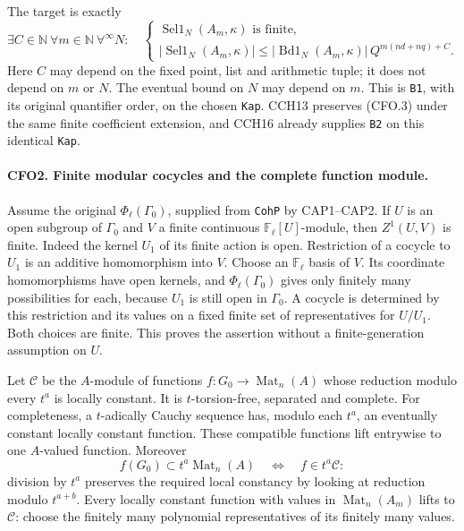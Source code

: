 The target is exactly
\[
 \exists C\in\mathbb N\ \forall m\in\mathbb N\
 \forall^\infty N:\quad
 \begin{cases}
  \operatorname{Sel1}_N(A_m,\kappa)\text{ is finite},\\
  |\operatorname{Sel1}_N(A_m,\kappa)|
   \le |\operatorname{Bd1}_N(A_m,\kappa)|\,Q^{m(nd+nq)+C}.
 \end{cases}                                                     \tag{CFO.4}
\]
Here $C$ may depend on the fixed point, list and arithmetic tuple;
it does not depend on $m$ or $N$.  The eventual bound on $N$ may
depend on $m$.  This is \texttt{B1}, with its original quantifier
order, on the chosen \texttt{Kap}.  CCH13 preserves (CFO.3) under
the same finite coefficient extension, and CCH16 already supplies
\texttt{B2} on this identical \texttt{Kap}.

\paragraph{CFO2. Finite modular cocycles and the complete function module.}
\label{claim:CFO2}
Assume the original $\Phi_\ell(\Gamma_0)$, supplied from
\texttt{CohP} by CAP1--CAP2.  If $U$ is an open subgroup of
$\Gamma_0$ and $V$ a finite continuous $\mathbb F_\ell[U]$-module,
then $Z^1(U,V)$ is finite.  Indeed the kernel $U_1$ of its finite
action is open.  Restriction of a cocycle to $U_1$ is an additive
homomorphism into $V$.  Choose an $\mathbb F_\ell$ basis of $V$.
Its coordinate homomorphisms have open kernels, and
$\Phi_\ell(\Gamma_0)$ gives only finitely many possibilities for
each, because $U_1$ is still open in $\Gamma_0$.  A cocycle is
determined by this restriction and its values on a fixed finite
set of representatives for $U/U_1$.  Both choices are finite.
This proves the assertion without a finite-generation assumption
on $U$.

Let $\mathcal C$ be the $A$-module of functions
$f:G_0\longrightarrow\operatorname{Mat}_n(A)$ whose reduction
modulo every $t^a$ is locally constant.  It is $t$-torsion-free,
separated and complete.  For completeness, a $t$-adically Cauchy
sequence has, modulo each $t^a$, an eventually constant locally
constant function.  These compatible functions lift entrywise to
one $A$-valued function.  Moreover
\[
 f(G_0)\subset t^a\operatorname{Mat}_n(A)
 \quad\Longleftrightarrow\quad f\in t^a\mathcal C:                 \tag{CFO.5}
\]
division by $t^a$ preserves the required local constancy by
looking at reduction modulo $t^{a+b}$.  Every locally constant
function with values in $\operatorname{Mat}_n(A_m)$ lifts to
$\mathcal C$: choose the finitely many polynomial representatives
of its finitely many values.

